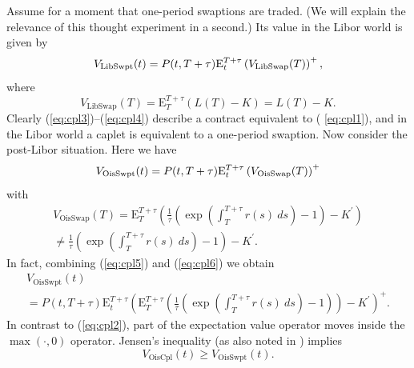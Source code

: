 \documentclass{article}
\begin{document}
Assume for a moment that one-period swaptions are traded. (We will explain
the relevance of this thought experiment in a second.) Its value in the
Libor world is given by%
\begin{equation}
V_{\mathrm{LibSwpt}}(t)=P(t,T+\tau )\mathrm{E}_{t}^{T+\tau }\left( V_{%
\mathrm{LibSwap}}(T)\right) ^{+},  \label{eq:cpl3}
\end{equation}%
where%
\begin{equation}
V_{\mathrm{LibSwap}}(T)=\mathrm{E}_{T}^{T+\tau }\left( L(T)-K\right) =L(T)-K.
\label{eq:cpl4}
\end{equation}%
Clearly (\ref{eq:cpl3})--(\ref{eq:cpl4}) describe a contract equivalent to (%
\ref{eq:cpl1}), and in the Libor world a caplet is equivalent to a
one-period swaption. Now consider the post-Libor situation. Here we have%
\begin{equation}
V_{\mathrm{OisSwpt}}(t)=P(t,T+\tau )\mathrm{E}_{t}^{T+\tau }\left( V_{%
\mathrm{OisSwap}}(T)\right) ^{+}  \label{eq:cpl5}
\end{equation}%
with%
\begin{multline}
V_{\mathrm{OisSwap}}(T)=\mathrm{E}_{T}^{T+\tau }\left( \frac{1}{\tau }\left(
\exp \left( \int_{T}^{T+\tau }r(s)~ds\right) -1\right) -K^{\prime }\right) 
\label{eq:cpl6} \\
\neq \frac{1}{\tau }\left( \exp \left( \int_{T}^{T+\tau }r(s)~ds\right)
-1\right) -K^{\prime }.
\end{multline}%
In fact, combining (\ref{eq:cpl5}) and (\ref{eq:cpl6}) we obtain%
\begin{multline}
V_{\mathrm{OisSwpt}}(t)  \label{eq:cpl7} \\
=P(t,T+\tau )\mathrm{E}_{t}^{T+\tau }\left( \mathrm{E}_{T}^{T+\tau }\left( 
\frac{1}{\tau }\left( \exp \left( \int_{T}^{T+\tau }r(s)~ds\right) -1\right)
\right) -K^{\prime }\right) ^{+}.
\end{multline}%
In contrast to (\ref{eq:cpl2}), part of the expectation value operator moves
inside the $\max (\cdot ,0)$ operator. Jensen's inequality (as also noted in 
\cite{lyas-merc-l}) implies%
\begin{equation}
V_{\mathrm{OisCpl}}(t)\geq V_{\mathrm{OisSwpt}}(t).  \label{eq:cpl8}
\end{equation}
\end{document}
